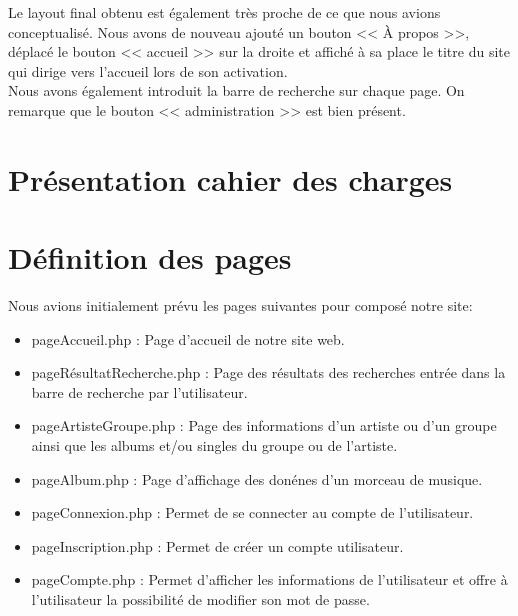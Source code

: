 
        \begin{paragraphe}
            Le layout final obtenu est également très proche de ce que nous avions conceptualisé. Nous avons de nouveau ajouté un bouton << À propos >>,
            déplacé le bouton << accueil >> sur la droite et affiché à sa place le titre du site qui dirige vers l'accueil lors de son activation.\\
            Nous avons également introduit la barre de recherche sur chaque page. On remarque que le bouton << administration >> est bien présent.
        \end{paragraphe}


    \newpage

\section{Présentation cahier des charges}

\newpage

\section{Définition des pages}

	    	\begin{paragraphe}
	    	    Nous avions initialement prévu les pages suivantes pour composé notre site:\\
        		\begin{itemize}
        			\item pageAccueil.php : Page d'accueil de notre site web.
        			\item pageRésultatRecherche.php : Page des résultats des recherches entrée dans la barre de recherche par l'utilisateur.
        			\item pageArtisteGroupe.php : Page des informations d'un artiste ou d'un groupe ainsi que les albums et/ou singles du groupe ou de l'artiste.
        			\item pageAlbum.php : Page d'affichage des donénes d'un morceau de musique.
        		\end{itemize}
        	\end{paragraphe}

        	\begin{paragraphe}
        		\begin{itemize}
        			\item pageConnexion.php : Permet de se connecter au compte de l'utilisateur.
        			\item pageInscription.php : Permet de créer un compte utilisateur.
        			\item pageCompte.php : Permet d'afficher les informations de l'utilisateur et offre à l'utilisateur la possibilité de modifier son mot de passe.
        		\end{itemize}
        	\end{paragraphe}

